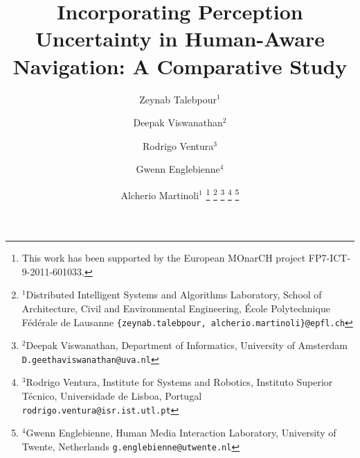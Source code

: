 \documentclass[letterpaper, 10 pt, conference]{ieeeconf}  %
\title{Incorporating Perception Uncertainty in Human-Aware Navigation: A Comparative Study}
\author{Zeynab Talebpour$^{1}$ \and Deepak Viswanathan$^{2}$ \and Rodrigo Ventura$^{3}$ \and Gwenn Englebienne$^{4}$  \and Alcherio Martinoli$^{1}$%
\thanks{This work has been supported by the European MOnarCH project FP7-ICT-9-2011-601033.}%
\thanks{$^{1}$Distributed Intelligent Systems and Algorithms Laboratory,
School of Architecture, Civil and Environmental Engineering,
 \'Ecole Polytechnique F\'ed\'erale de Lausanne 
        {\tt\small \{zeynab.talebpour, alcherio.martinoli\}@epfl.ch}}%
\thanks{$^{2}$Deepak Viswanathan, Department of Informatics, University of Amsterdam
        {\tt\small D.geethaviswanathan@uva.nl}}%
\thanks{$^{3}$Rodrigo Ventura, Institute for Systems and Robotics, Instituto Superior T\'ecnico, Universidade de Lisboa, Portugal
        {\tt\small  rodrigo.ventura@isr.ist.utl.pt}}%
\thanks{$^{4}$Gwenn Englebienne, Human Media Interaction Laboratory, University of Twente, Netherlands
        {\tt\small g.englebienne@utwente.nl}}%
}
\begin{document}
\maketitle
\thispagestyle{empty}
\pagestyle{empty}


\begin{abstract}


\end{abstract}









%











\end{document}
